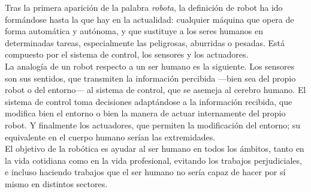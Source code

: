 Tras la primera aparición de la palabra \textit{robota}, la definición de robot ha ido formándose hasta la que hay en la actualidad:  cualquier máquina que opera de forma automática y autónoma, y que sustituye a los seres humanos en determinadas tareas, especialmente las peligrosas, aburridas o pesadas. Está compuesto por el sistema de control, los sensores y los actuadores.\\

La analogía de un robot respecto a un ser humano es la siguiente. Los sensores son sus sentidos, que transmiten la información percibida ---bien sea del propio robot o del entorno--- al sistema de control, que se asemeja al cerebro humano. El sistema de control toma decisiones adaptándose a la información recibida, que modifica bien el entorno o bien la manera de actuar internamente del propio robot. Y finalmente los actuadores, que permiten la modificación del entorno; su equivalente en el cuerpo humano serían las extremidades.\\

El objetivo de la robótica es ayudar al ser humano en todos los ámbitos, tanto en la vida cotidiana como en la vida profesional, evitando los trabajos perjudiciales, e incluso haciendo trabajos que el ser humano no sería capaz de hacer por sí mismo en distintos sectores.\\

